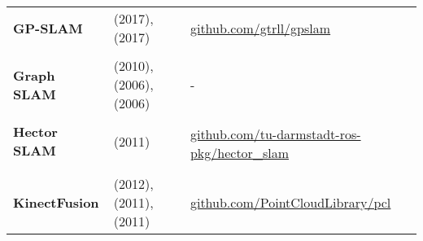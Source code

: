 \documentclass[a4paper,12pt]{scrartcl}
\begin{document}
{\begin{longtable}{l|l|l}
    \textbf{GP-SLAM}                                                                                                              & \cite{Yan2017} (2017), \cite{Dong2017} (2017)
                                                                                                                                  & {\href{https://github.com/gtrll/gpslam}{github.com/gtrll/gpslam}}                         \\
                                                                                                                                  &                                                                                            &   \\ [-3mm]
    \textbf{Graph SLAM}                                                                                                           & \cite{Grisetti2010} (2010), \cite{Olson2006} (2006), \cite{Thrun2006} (2006)               & - \\
                                                                                                                                  &                                                                                            &   \\ [-3mm]
    \textbf{Hector SLAM}                                                                                                          & \cite{Kohlbrecher2011} (2011)
                                                                                                                                  &
    \multirow{2}{15em}{\href{https://github.com/tu-darmstadt-ros-pkg/hector_slam}{github.com/tu-darmstadt-ros-pkg/hector\_slam}} \\
                                                                                                                                  &                                                                                            &   \\
                                                                                                                                  &                                                                                            &   \\ [-3mm]
    \textbf{KinectFusion}                                                                                                         & \cite{Pirovano2012} (2012), \cite{Izadi2011} (2011), \cite{Newcombe2011a} (2011)
                                                                                                                                  & {\href{https://github.com/PointCloudLibrary/pcl}{github.com/PointCloudLibrary/pcl}}       \\

\end{longtable}}
\end{document}
